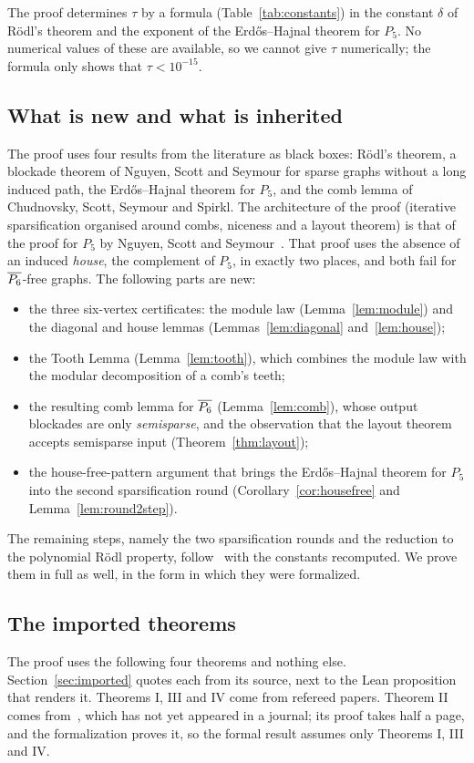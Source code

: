 The proof determines $\tau$ by a formula (Table~\ref{tab:constants}) in the constant $\delta$ of R\"odl's
theorem and the exponent of the Erd\H{o}s--Hajnal theorem for $P_5$. No numerical values of these are
available, so we cannot give $\tau$ numerically; the formula only shows that $\tau<10^{-15}$.

\subsection*{What is new and what is inherited}
The proof uses four results from the literature as black boxes: R\"odl's theorem, a blockade theorem of Nguyen,
Scott and Seymour for sparse graphs without a long induced path, the Erd\H{o}s--Hajnal theorem for
$P_5$, and the comb lemma of Chudnovsky, Scott, Seymour and Spirkl. The architecture of the proof
(iterative sparsification organised around combs, niceness and a layout theorem) is that of the proof for
$P_5$ by Nguyen, Scott and Seymour~\cite{NSS7}. That proof uses the absence of an induced \emph{house},
the complement of $P_5$, in exactly two places, and both fail for $\overline{P_6}$-free graphs. The following parts
are new:
\begin{itemize}[leftmargin=1.5em]
\item the three six-vertex certificates: the module law (Lemma~\ref{lem:module}) and the diagonal and
  house lemmas (Lemmas~\ref{lem:diagonal} and~\ref{lem:house});
\item the Tooth Lemma (Lemma~\ref{lem:tooth}), which combines the module law with the modular
  decomposition of a comb's teeth;
\item the resulting comb lemma for $\overline{P_6}$ (Lemma~\ref{lem:comb}), whose output blockades are only
  \emph{semisparse}, and the observation that the layout theorem accepts semisparse input
  (Theorem~\ref{thm:layout});
\item the house-free-pattern argument that brings the Erd\H{o}s--Hajnal theorem for $P_5$ into the second
  sparsification round (Corollary~\ref{cor:housefree} and Lemma~\ref{lem:round2step}).
\end{itemize}
The remaining steps, namely the two sparsification rounds and the reduction to the polynomial R\"odl
property, follow~\cite{NSS7} with the constants recomputed. We prove them in full as well, in the form in
which they were formalized.

\subsection*{The imported theorems}
The proof uses the following four theorems and nothing else. Section~\ref{sec:imported} quotes each
from its source, next to the Lean proposition that renders it. Theorems I, III and IV come from refereed
papers. Theorem II comes from~\cite{NSS5}, which has not yet appeared in a journal; its proof takes half a
page, and the formalization proves it, so the formal result assumes only Theorems I, III and IV.

